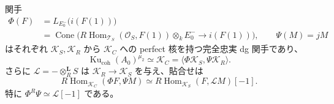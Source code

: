 \begin{theorem}[同変残余圏の実二成分分解]
\label{cmo:thm:root-order-residual}
関手
\begin{equation}
\label{cmo:eq:root-order-boundary-kernel}
 \begin{split}
 \Phi(F)&=L_{E_0^-}\bigl(i(F(1))\bigr)\\
 &=\operatorname{Cone}\bigl(
   R\operatorname{Hom}_{\mathcal T_S}(\mathcal O_S,F(1))
      \otimes_k E_0^-
    \longrightarrow i(F(1))\bigr),\qquad
 \Psi(M)=jM
 \end{split}
\end{equation}
はそれぞれ $\mathcal K_S,\mathcal K_R$ から $\mathcal K_C$ への
perfect 核を持つ完全忠実 dg 関手であり、
\begin{equation}
\label{cmo:eq:root-order-residual-sod}
 \operatorname{Ku}_{\mathrm{coh}}(A_0)^{\mu_2}
 \simeq\mathcal K_C
 =\langle\Phi\mathcal K_S,\Psi\mathcal K_R\rangle.
\end{equation}
さらに $\mathcal L=-\otimes_R^{\mathbf L}S$ は
$\mathcal K_R\to\mathcal K_S$ を与え、貼合せは
\begin{equation}
\label{cmo:eq:root-order-residual-gluing}
 R\operatorname{Hom}_{\mathcal K_C}(\Phi F,\Psi M)
 \simeq R\operatorname{Hom}_{\mathcal K_S}(F,\mathcal L M)[-1].
\end{equation}
特に $\Phi^R\Psi\simeq\mathcal L[-1]$ である。
\end{theorem}

